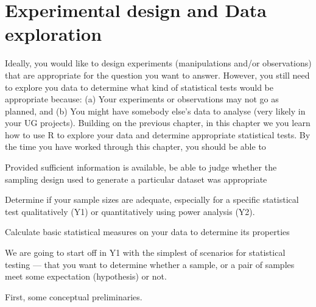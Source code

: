 \chapter{Experimental design and Data exploration}
\label{ch:ExpDesign}

Ideally, you would like to design experiments (manipulations and/or 
observations) that are appropriate for the question you want to answer. 
However, you still need to explore you data to determine what kind of 
statistical tests would be appropriate because: (a) Your experiments or 
observations may not go as planned, and (b) You might have somebody 
else's data to analyse (very likely in your UG projects). Building on 
the previous chapter, in this chapter we you learn how to use R to 
explore your data and determine appropriate statistical tests. By the 
time you have worked through this chapter, you should be able to 

\begin{compactitem}
	\item Provided sufficient information is available, be able to judge 
	whether the sampling design used to generate a particular dataset was 
	appropriate
	\item Determine if your sample sizes are adequate, especially for a 
	specific statistical test qualitatively (Y1) or quantitatively using 
	power analysis (Y2). 
	\item Calculate basic statistical measures on your data to determine 
	its properties
\end{compactitem}

We are going to start off in Y1 with the simplest of scenarios for 
statistical testing --- that you want to determine whether a sample, or 
a pair of samples meet some expectation (hypothesis) or not. 

First, some conceptual preliminaries.

